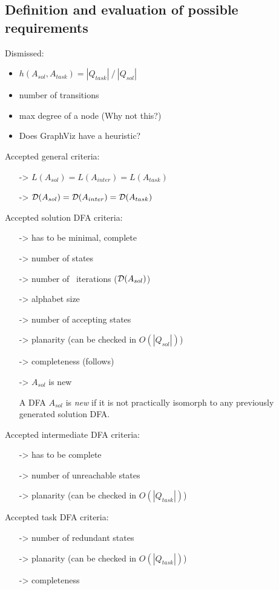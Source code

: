 \subsection{Definition and evaluation of possible requirements}

\label{ch:1:determined-requirements}
Dismissed:
\begin{itemize}
	\item $h(A_{sol}, A_{task}) = |Q_{task}|\ /\ |Q_{sol}|$
	\item number of transitions
	\item max degree of a node (Why not this?)
	\item Does GraphViz have a heuristic?
\end{itemize}
Accepted general criteria:
\begin{itemize}
	\item[->] $L(A_{sol}) = L(A_{inter}) = L(A_{task})$
	\item[->] $\mathcal{D}(A_{sol}) = \mathcal{D}(A_{inter}) = \mathcal{D}(A_{task})$
\end{itemize}
Accepted solution DFA criteria:
\begin{itemize}
	\item[->] has to be minimal, complete
	\item[->] number of states
	\item[->] number of \CompDist\ iterations ($\mathcal{D}(A_{sol})$)
	\item[->] alphabet size
	\item[->] number of accepting states
	\item[->] planarity (can be checked in $O(|Q_{sol}|)$)
	\item[->] completeness (follows)
	\item[->] $A_{sol}$ is new
	
	\begin{definition} \label{ch:1:new-dfa}
		A DFA $A_{sol}$ is \emph{new} if it is not practically isomorph to any previously generated solution DFA.
	\end{definition}
\end{itemize}
Accepted intermediate DFA criteria:
\begin{itemize}
	\item[->] has to be complete
	\item[->] number of unreachable states
	\item[->] planarity (can be checked in $O(|Q_{task}|)$)
\end{itemize}
Accepted task DFA criteria:
\begin{itemize}
	\item[->] number of redundant states
	\item[->] planarity (can be checked in $O(|Q_{task}|)$)
	\item[->] completeness
\end{itemize}

